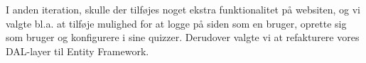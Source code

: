 I anden iteration, skulle der tilføjes noget ekstra funktionalitet på websiten, og vi valgte bl.a. at tilføje mulighed for at logge på siden som en bruger, oprette sig som bruger og konfigurere i sine quizzer. Derudover valgte vi at refakturere vores DAL-layer til Entity Framework. 













